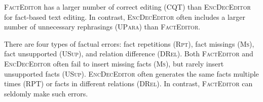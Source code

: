 \documentclass[11pt,a4paper]{article}
\begin{document}
\textsc{FactEditor} has a larger number of correct editing (\textsc{CQT}) than \textsc{EncDecEditor} for fact-based text editing. In contrast, \textsc{EncDecEditor} often includes a larger number of unnecessary rephrasings (\textsc{UPara}) than \textsc{FactEditor}.

There are four types of factual errors: fact repetitions (\textsc{Rpt}), fact missings (\textsc{Ms}), fact unsupported (\textsc{USup}), and relation difference (\textsc{DRel}). Both \textsc{FactEditor} and \textsc{EncDecEditor} often fail to insert missing facts (\textsc{Ms}), but rarely insert unsupported facts (\textsc{USup}). \textsc{EncDecEditor} often generates the same facts multiple times (\textsc{RPT}) or facts in different relations (\textsc{DRel}). In contrast, \textsc{FactEditor} can seldomly make such errors.
\end{document}
